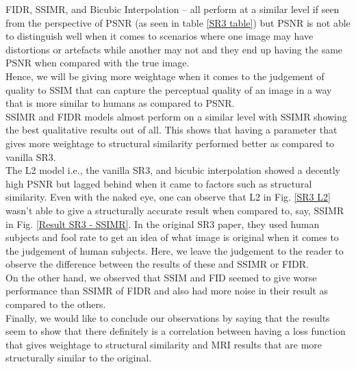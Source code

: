 FIDR, SSIMR, and Bicubic Interpolation -- all perform at a similar level if seen from the perspective of PSNR (as seen in table \ref{SR3 table}) but PSNR is not able to distinguish well when it comes to scenarios where one image may have distortions or artefacts while another may not and they end up having the same PSNR when compared with the true image.\\

Hence, we will be giving more weightage when it comes to the judgement of quality to SSIM that can capture the perceptual quality of an image in a way that is more similar to humans as compared to PSNR.\\

SSIMR and FIDR models almost perform on a similar level with SSIMR showing the best qualitative results out of all. This shows that having a parameter that gives more weightage to structural similarity performed better as compared to vanilla SR3.\\

The L2 model i.e., the vanilla SR3, and bicubic interpolation showed a decently high PSNR but lagged behind when it came to factors such as structural similarity. Even with the naked eye, one can observe that L2 in Fig. \ref{SR3 L2} wasn't able to give a structurally accurate result when compared to, say, SSIMR in Fig. \ref{Result SR3 - SSIMR}. In the original SR3 paper, they used human subjects and fool rate to get an idea of what image is original when it comes to the judgement of human subjects. Here, we leave the judgement to the reader to observe the difference between the results of these and SSIMR or FIDR.\\

On the other hand, we observed that SSIM and FID seemed to give worse performance than SSIMR of FIDR and also had more noise in their result as compared to the others.\\

Finally, we would like to conclude our observations by saying that the results seem to show that there definitely is a correlation between having a loss function that gives weightage to structural similarity and MRI results that are more structurally similar to the original.

